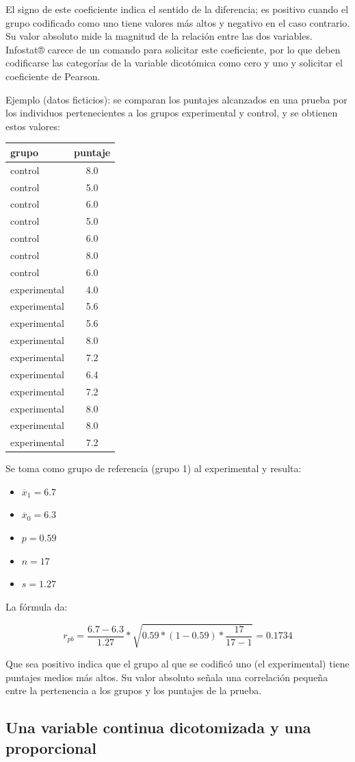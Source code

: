 \documentclass[]{book}
\begin{document}
El signo de este coeficiente indica el sentido de la diferencia; es positivo cuando el grupo codificado como uno tiene valores más altos y negativo en el caso contrario. Su valor absoluto mide la magnitud de la relación entre las dos variables. Infostat® carece de un comando para solicitar este coeficiente, por lo que deben codificarse las categorías de la variable dicotómica como cero y uno y solicitar el coeficiente de Pearson.

Ejemplo (datos ficticios): se comparan los puntajes alcanzados en una prueba por los individuos pertenecientes a los grupos experimental y
control, y se obtienen estos valores:

\begin{longtable}[]{@{}lc@{}}
\toprule
grupo & puntaje\tabularnewline
\midrule
\endhead
control & 8.0\tabularnewline
control & 5.0\tabularnewline
control & 6.0\tabularnewline
control & 5.0\tabularnewline
control & 6.0\tabularnewline
control & 8.0\tabularnewline
control & 6.0\tabularnewline
experimental & 4.0\tabularnewline
experimental & 5.6\tabularnewline
experimental & 5.6\tabularnewline
experimental & 8.0\tabularnewline
experimental & 7.2\tabularnewline
experimental & 6.4\tabularnewline
experimental & 7.2\tabularnewline
experimental & 8.0\tabularnewline
experimental & 8.0\tabularnewline
experimental & 7.2\tabularnewline
\bottomrule
\end{longtable}

Se toma como grupo de referencia (grupo 1) al experimental y resulta:

\begin{itemize}
\item
  \({\overline{x}}_{1} = 6.7\)
\item
  \({\overline{x}}_{0} = 6.3\)
\item
  \(p = 0.59\)
\item
  \(n = 17\)
\item
  \(s = 1.27\)
\end{itemize}

La fórmula da:

\[r_{pb} = \frac{6.7 - 6.3}{1.27}*\sqrt{0.59*(1 - 0.59)*\frac{17}{17 - 1}} = 0.1734\]

Que sea positivo indica que el grupo al que se codificó uno (el
experimental) tiene puntajes medios más altos. Su valor absoluto señala una correlación pequeña entre la pertenencia a los grupos y los puntajes de la prueba.

\hypertarget{una-variable-continua-dicotomizada-y-una-proporcional}{%
\subsection{Una variable continua dicotomizada y una proporcional}\label{una-variable-continua-dicotomizada-y-una-proporcional}}
\end{document}
